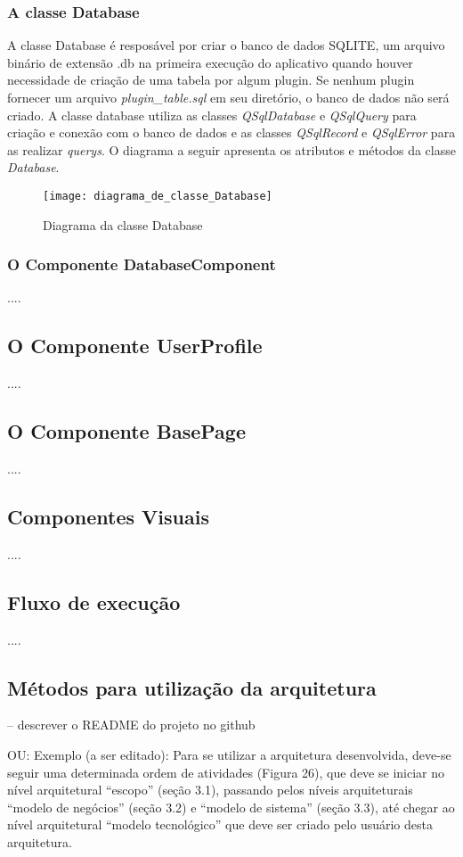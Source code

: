 \subsubsection{A classe Database}\label{sec:solucao-desenvolvida}
A classe Database é resposável por criar o banco de dados SQLITE, um arquivo binário de extensão .db na primeira execução do aplicativo quando houver necessidade de criação de uma tabela por algum plugin. Se nenhum plugin fornecer um arquivo \textit{plugin\_table.sql} em seu diretório, o banco de dados não será criado. A classe database utiliza as classes \textit{QSqlDatabase} e \textit{QSqlQuery} para criação e conexão com o banco de dados e as classes \textit{QSqlRecord} e \textit{QSqlError} para as realizar \textit{querys}. O diagrama a seguir apresenta os atributos e métodos da classe \textit{Database}.
\begin{figure}[h]
	\texttt{[image: diagrama\_de\_classe\_Database]}
	\centering
	\caption{Diagrama da classe Database}
\end{figure}

\subsubsection{O Componente DatabaseComponent}\label{sec:solucao-desenvolvida}
....


\subsection{O Componente UserProfile}\label{sec:solucao-desenvolvida}
....


\subsection{O Componente BasePage}\label{sec:solucao-desenvolvida}
....


\subsection{Componentes Visuais}\label{sec:solucao-desenvolvida}
....


\subsection{Fluxo de execução}\label{sec:solucao-desenvolvida}
....


\subsection{Métodos para utilização da arquitetura}
-- descrever o README do projeto no github

OU:
Exemplo (a ser editado): Para se utilizar a arquitetura desenvolvida, deve-se seguir uma determinada ordem de atividades (Figura 26), que deve se iniciar no nível arquitetural “escopo” (seção 3.1), passando pelos níveis arquiteturais “modelo de negócios” (seção 3.2) e “modelo de sistema” (seção 3.3), até chegar ao nível arquitetural “modelo tecnológico” que deve ser criado pelo usuário desta arquitetura.